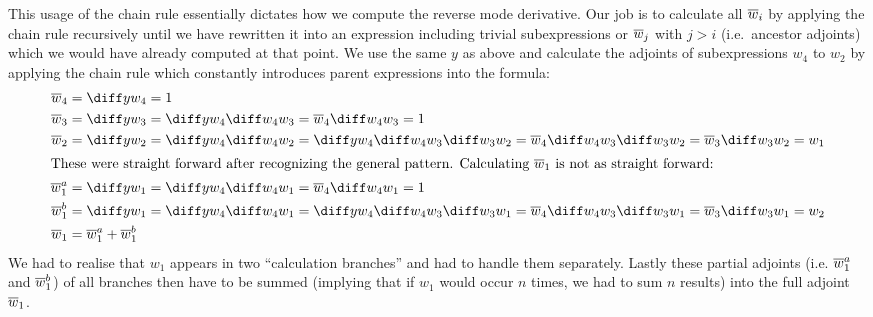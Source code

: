 This usage of the chain rule essentially dictates how we compute the reverse mode derivative. Our job is to calculate all $\overline{w}_{i}$ by applying the chain rule recursively until we have rewritten it into an expression including trivial subexpressions or $\overline{w}_{j}$ with $j > i$ (i.e.\ ancestor adjoints) which we would have already computed at that point. We use the same $y$ as above and calculate the adjoints of subexpressions $w_4$ to $w_2$ by applying the chain rule which constantly introduces parent expressions into the formula:
\yExampleDiff
\begin{align*}
    \overw{4}   & = \diffyw{4} = 1                                                                                                           \\
    \overw{3}   & = \diffyw{3} = \diffyw{4}\diffw{4}{3} = \overw{4}\diffw{4}{3} = 1                                                          \\
    \overw{2}   & = \diffyw{2} = \diffyw{4}\diffw{4}{2} = \diffyw{4}\diffw{4}{3}\diffw{3}{2} = \overw{4}\diffw{4}{3}\diffw{3}{2} = \overw{3}\diffw{3}{2} = w_1       \\
    \intertext{These were straight forward after recognizing the general pattern. Calculating $\overw{1}$ is not as straight forward:}
    \overw{1}^a & = \diffyw{1} = \diffyw{4}\diffw{4}{1} = \overw{4}\diffw{4}{1} = 1 \\
    \overw{1}^b & = \diffyw{1} = \diffyw{4}\diffw{4}{1} = \diffyw{4}\diffw{4}{3}\diffw{3}{1} = \overw{4}\diffw{4}{3}\diffw{3}{1} = \overw{3}\diffw{3}{1} = w_2       \\
    \overw{1}   & = \overw{1}^a + \overw{1}^b
\end{align*}
We had to realise that $w_1$ appears in two ``calculation branches'' and had to handle them separately. Lastly these partial adjoints (i.e. $\overline{w}_{1}^a$ and $\overline{w}_{1}^b$) of all branches then have to be summed (implying that if $w_1$ would occur $n$ times, we had to sum $n$ results) into the full adjoint $\overline{w}_{1}$.

